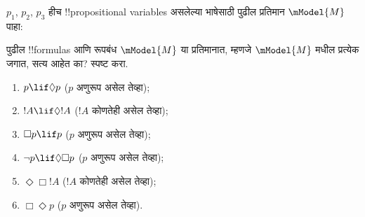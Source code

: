 \documentclass[../../../include/open-logic-section]{subfiles}
\begin{document}
\begin{prob}
  $p_1$, $p_2$, $p_3$ हीच !!{propositional variable}s असलेल्या
  भाषेसाठी पुढील प्रतिमान $\mModel{M}$ पाहा:
  \begin{center}
  \end{center}
  पुढील !!{formula}s आणि रूपबंध $\mModel{M}$ या प्रतिमानात,
  म्हणजे $\mModel{M}$ मधील प्रत्येक जगात, सत्य आहेत का? स्पष्ट करा.
  \begin{enumerate}
  \item $p\lif \Diamond p$ ($p$ अणुरूप असेल तेव्हा);
  \item $!A\lif \Diamond !A$ ($!A$ कोणतेही असेल तेव्हा);
  \item $\Box p \lif p$ ($p$ अणुरूप असेल तेव्हा);
  \item $\lnot p \lif \Diamond \Box p$ ($p$ अणुरूप असेल तेव्हा);
  \item $\Diamond \Box !A$ ($!A$ कोणतेही असेल तेव्हा);
  \item $\Box \Diamond p$ ($p$ अणुरूप असेल तेव्हा).
  \end{enumerate}
\end{prob}
\end{document}
